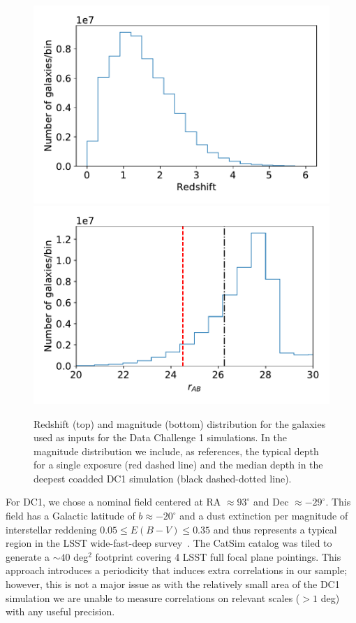 \documentclass[\docopts]{\docclass}
\begin{document}
\begin{figure}
\centering
\includegraphics[width=0.9\columnwidth]{N_z_DC1.pdf}
\includegraphics[width=0.9\columnwidth]{N_m_DC1.pdf}
\caption{Redshift (top) and magnitude (bottom) distribution for the galaxies used as inputs for the Data Challenge 1 simulations. In the magnitude distribution we include, as references, the typical depth for a single exposure (red dashed line) and the median depth in the deepest coadded DC1 simulation (black dashed-dotted line).}
\label{fig:catalog_plots}
\end{figure}


For DC1, we chose a nominal field centered at RA $\approx 93^{\circ}$ and Dec $\approx -29^{\circ}$. This field has a Galactic latitude of $b \approx -20^{\circ}$ and a dust extinction per magnitude of interstellar reddening $0.05 \leq E(B-V) \leq 0.35$ and thus represents a typical region in the LSST wide-fast-deep survey~\citep{Overview}. The CatSim catalog was tiled to generate a $\sim 40$ deg$^{2}$ footprint covering 4 LSST full focal plane pointings. This approach introduces a periodicity that induces extra correlations in our sample; however, this is not a major issue as with the relatively small area of the DC1 simulation we are unable to measure correlations on relevant scales ($> 1$ deg) with any useful precision.
\end{document}
